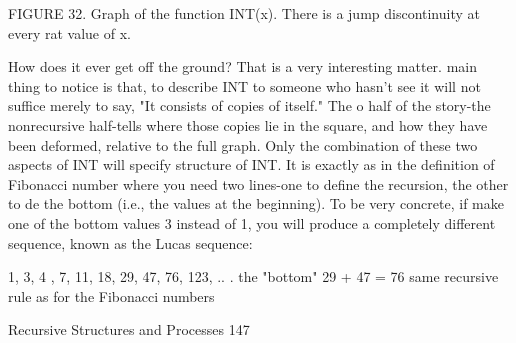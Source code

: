 FIGURE 32. Graph of the function INT(x). There is a jump discontinuity at every rat
value of x.

How does it ever get off the ground? That is a very interesting matter. main thing to
notice is that, to describe INT to someone who hasn't see it will not suffice merely to say,
"It consists of copies of itself." The o half of the story-the nonrecursive half-tells where
those copies lie in the square, and how they have been deformed, relative to the full
graph. Only the combination of these two aspects of INT will specify structure of INT. It
is exactly as in the definition of Fibonacci number where you need two lines-one to
define the recursion, the other to de the bottom (i.e., the values at the beginning). To be
very concrete, if make one of the bottom values 3 instead of 1, you will produce a
completely different sequence, known as the Lucas sequence:

       1, 3, 4 , 7,     11,   18,   29, 47, 76, 123, .. .
       the "bottom"                 29 + 47 = 76
                                     same recursive rule
                                     as for the Fibonacci numbers




Recursive Structures and Processes                                                      147

